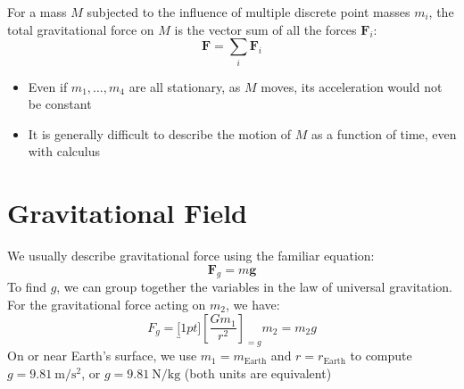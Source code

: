 \begin{figure}[ht]
  \centering
\end{figure}

For a mass $M$ subjected to the influence of multiple discrete point masses
$m_i$, the total gravitational force on $M$ is the vector sum of all the
forces $\bm F_i$:
\begin{equation}
  \boxed{
    \bm F=\sum_i\bm F_i
  }
\end{equation}
\begin{itemize}
\item Even if $m_1,\ldots,m_4$ are all stationary, as $M$ moves, its
  acceleration would not be constant
\item It is generally difficult to describe the motion of $M$ as a function
  of time, even with calculus
\end{itemize}
  



\section{Gravitational Field}
We usually describe gravitational force using the familiar equation:
\begin{equation*}
  \bm F_g=m\bm g
\end{equation*}
To find $g$, we can group together the variables in the law of
universal gravitation. For the gravitational force acting on $m_2$, we have:
\begin{equation} 
  F_g=\underbracket[1pt]{\left[\frac{Gm_1}{r^2}\right]}_{=g}m_2=m_2g
\end{equation}
On or near Earth's surface, we use $m_1=m_\text{Earth}$ and $r=r_\text{Earth}$
to compute $g=\SI{9.81}{\metre\per\second\squared}$, or
$g=\SI{9.81}{\newton\per\kilo\gram}$ (both units are equivalent)




